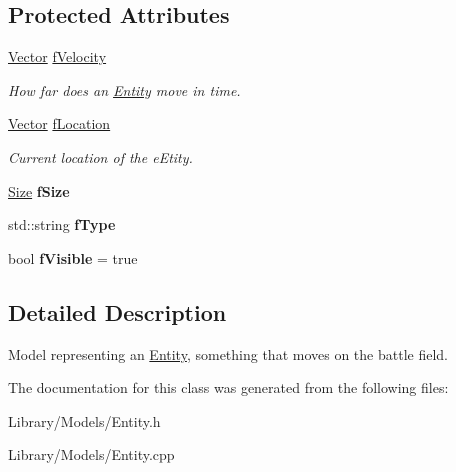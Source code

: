 \subsection*{Protected Attributes}
\begin{DoxyCompactItemize}
\item 
\hypertarget{classty_lib_1_1_entity_ac22c7aa6072ffde1433cf37d20b4c09c}{}\hyperlink{classty_lib_1_1_vector}{Vector} \hyperlink{classty_lib_1_1_entity_ac22c7aa6072ffde1433cf37d20b4c09c}{f\+Velocity}\label{classty_lib_1_1_entity_ac22c7aa6072ffde1433cf37d20b4c09c}

\begin{DoxyCompactList}\small\item\em How far does an \hyperlink{classty_lib_1_1_entity}{Entity} move in time. \end{DoxyCompactList}\item 
\hypertarget{classty_lib_1_1_entity_a5491a29abfb23b2adaa8091d99ef0dff}{}\hyperlink{classty_lib_1_1_vector}{Vector} \hyperlink{classty_lib_1_1_entity_a5491a29abfb23b2adaa8091d99ef0dff}{f\+Location}\label{classty_lib_1_1_entity_a5491a29abfb23b2adaa8091d99ef0dff}

\begin{DoxyCompactList}\small\item\em Current location of the e\+Etity. \end{DoxyCompactList}\item 
\hypertarget{classty_lib_1_1_entity_a89765b7b2c2c4666f6dba9b928b1172d}{}\hyperlink{classty_lib_1_1_size}{Size} {\bfseries f\+Size}\label{classty_lib_1_1_entity_a89765b7b2c2c4666f6dba9b928b1172d}

\item 
\hypertarget{classty_lib_1_1_entity_a748286a55e371c6f1440e2f43a0a46fa}{}std\+::string {\bfseries f\+Type}\label{classty_lib_1_1_entity_a748286a55e371c6f1440e2f43a0a46fa}

\item 
\hypertarget{classty_lib_1_1_entity_a542cc85a72ac413c574cd15c09a08e8b}{}bool {\bfseries f\+Visible} = true\label{classty_lib_1_1_entity_a542cc85a72ac413c574cd15c09a08e8b}

\end{DoxyCompactItemize}


\subsection{Detailed Description}
Model representing an \hyperlink{classty_lib_1_1_entity}{Entity}, something that moves on the battle field. 

The documentation for this class was generated from the following files\+:\begin{DoxyCompactItemize}
\item 
Library/\+Models/Entity.\+h\item 
Library/\+Models/Entity.\+cpp\end{DoxyCompactItemize}
